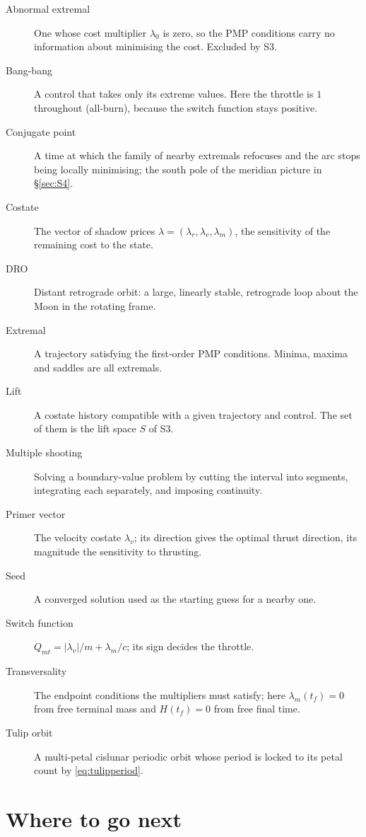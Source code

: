 \documentclass[11pt]{article}
\newcommand{\lv}{\lambda_v}\newcommand{\lr}{\lambda_r}\newcommand{\lm}{\lambda_m}
\newcommand{\tf}{t_f}\newcommand{\R}{\mathbb{R}}
\newcommand{\Qmt}{Q_{mt}}
\begin{document}
\begin{description}
\item[Abnormal extremal] One whose cost multiplier $\lambda_0$ is zero, so the
PMP conditions carry no information about minimising the cost. Excluded by S3.
\item[Bang-bang] A control that takes only its extreme values. Here the
throttle is $1$ throughout (all-burn), because the switch function stays
positive.
\item[Conjugate point] A time at which the family of nearby extremals refocuses
and the arc stops being locally minimising; the south pole of the meridian
picture in \S\ref{sec:S4}.
\item[Costate] The vector of shadow prices $\lambda = (\lr, \lv, \lm)$, the
sensitivity of the remaining cost to the state.
\item[DRO] Distant retrograde orbit: a large, linearly stable, retrograde loop
about the Moon in the rotating frame.
\item[Extremal] A trajectory satisfying the first-order PMP conditions. Minima,
maxima and saddles are all extremals.
\item[Lift] A costate history compatible with a given trajectory and control.
The set of them is the lift space $S$ of S3.
\item[Multiple shooting] Solving a boundary-value problem by cutting the
interval into segments, integrating each separately, and imposing continuity.
\item[Primer vector] The velocity costate $\lv$; its direction gives the
optimal thrust direction, its magnitude the sensitivity to thrusting.
\item[Seed] A converged solution used as the starting guess for a nearby one.
\item[Switch function] $\Qmt = |\lv|/m + \lm/c$; its sign decides the throttle.
\item[Transversality] The endpoint conditions the multipliers must satisfy;
here $\lm(\tf) = 0$ from free terminal mass and $H(\tf) = 0$ from free final
time.
\item[Tulip orbit] A multi-petal cislunar periodic orbit whose period is locked
to its petal count by \eqref{eq:tulipperiod}.
\end{description}

\section*{Where to go next}
\end{document}
